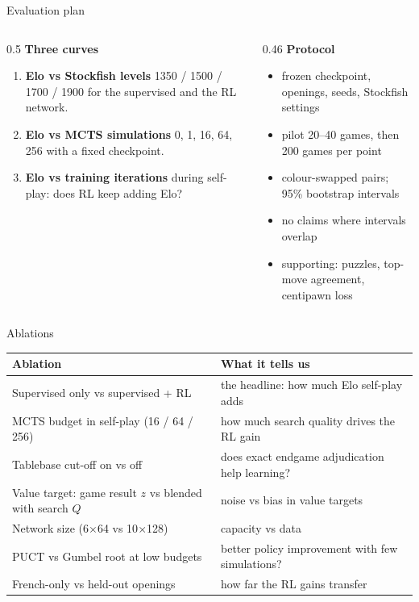 \documentclass[aspectratio=169, 10pt]{beamer}
\begin{document}
\begin{frame}{Evaluation plan}
  \begin{columns}[T]
    \begin{column}{0.5\textwidth}
      \textbf{Three curves}
      \begin{enumerate}
        \item \textbf{Elo vs Stockfish levels} 1350 / 1500 / 1700 / 1900 for the supervised
          and the RL network.
        \item \textbf{Elo vs MCTS simulations} 0, 1, 16, 64, 256 with a fixed checkpoint.
        \item \textbf{Elo vs training iterations} during self-play: does RL keep adding Elo?
      \end{enumerate}
    \end{column}
    \begin{column}{0.46\textwidth}
      \textbf{Protocol}
      \begin{itemize}
        \small
        \item frozen checkpoint, openings, seeds, Stockfish settings
        \item pilot 20--40 games, then 200 games per point
        \item colour-swapped pairs; 95\% bootstrap intervals
        \item no claims where intervals overlap
        \item supporting: puzzles, top-move agreement, centipawn loss
      \end{itemize}
    \end{column}
  \end{columns}
\end{frame}

\begin{frame}{Ablations}
  \small
  \begin{tabular}{@{}p{}p{}@{}}
    \toprule
    Ablation & What it tells us \\
    \midrule
    Supervised only vs supervised + RL & the headline: how much Elo self-play adds \\
    MCTS budget in self-play (16 / 64 / 256) & how much search quality drives the RL gain \\
    Tablebase cut-off on vs off & does exact endgame adjudication help learning? \\
    Value target: game result $z$ vs blended with search $Q$ & noise vs bias in value targets \\
    Network size (6$\times$64 vs 10$\times$128) & capacity vs data \\
    PUCT vs Gumbel root at low budgets & better policy improvement with few simulations? \\
    French-only vs held-out openings & how far the RL gains transfer \\
    \bottomrule
  \end{tabular}
\end{frame}
\end{document}

